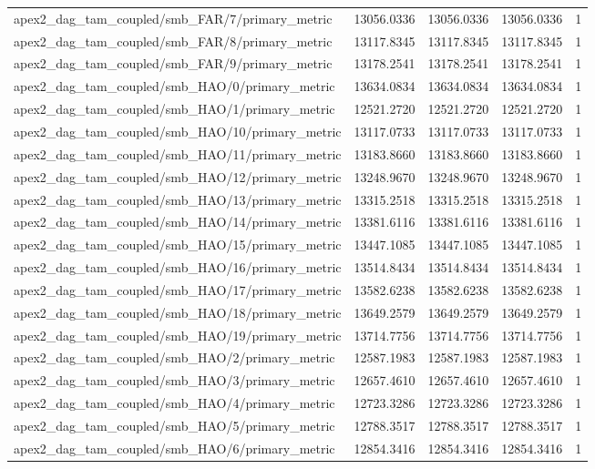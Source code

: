 \begin{table}[h]
\begin{tabular}{lrrrr}
apex2_dag_tam_coupled/smb_FAR/7/primary_metric & 13056.0336 & 13056.0336 & 13056.0336 & 1 \\
apex2_dag_tam_coupled/smb_FAR/8/primary_metric & 13117.8345 & 13117.8345 & 13117.8345 & 1 \\
apex2_dag_tam_coupled/smb_FAR/9/primary_metric & 13178.2541 & 13178.2541 & 13178.2541 & 1 \\
apex2_dag_tam_coupled/smb_HAO/0/primary_metric & 13634.0834 & 13634.0834 & 13634.0834 & 1 \\
apex2_dag_tam_coupled/smb_HAO/1/primary_metric & 12521.2720 & 12521.2720 & 12521.2720 & 1 \\
apex2_dag_tam_coupled/smb_HAO/10/primary_metric & 13117.0733 & 13117.0733 & 13117.0733 & 1 \\
apex2_dag_tam_coupled/smb_HAO/11/primary_metric & 13183.8660 & 13183.8660 & 13183.8660 & 1 \\
apex2_dag_tam_coupled/smb_HAO/12/primary_metric & 13248.9670 & 13248.9670 & 13248.9670 & 1 \\
apex2_dag_tam_coupled/smb_HAO/13/primary_metric & 13315.2518 & 13315.2518 & 13315.2518 & 1 \\
apex2_dag_tam_coupled/smb_HAO/14/primary_metric & 13381.6116 & 13381.6116 & 13381.6116 & 1 \\
apex2_dag_tam_coupled/smb_HAO/15/primary_metric & 13447.1085 & 13447.1085 & 13447.1085 & 1 \\
apex2_dag_tam_coupled/smb_HAO/16/primary_metric & 13514.8434 & 13514.8434 & 13514.8434 & 1 \\
apex2_dag_tam_coupled/smb_HAO/17/primary_metric & 13582.6238 & 13582.6238 & 13582.6238 & 1 \\
apex2_dag_tam_coupled/smb_HAO/18/primary_metric & 13649.2579 & 13649.2579 & 13649.2579 & 1 \\
apex2_dag_tam_coupled/smb_HAO/19/primary_metric & 13714.7756 & 13714.7756 & 13714.7756 & 1 \\
apex2_dag_tam_coupled/smb_HAO/2/primary_metric & 12587.1983 & 12587.1983 & 12587.1983 & 1 \\
apex2_dag_tam_coupled/smb_HAO/3/primary_metric & 12657.4610 & 12657.4610 & 12657.4610 & 1 \\
apex2_dag_tam_coupled/smb_HAO/4/primary_metric & 12723.3286 & 12723.3286 & 12723.3286 & 1 \\
apex2_dag_tam_coupled/smb_HAO/5/primary_metric & 12788.3517 & 12788.3517 & 12788.3517 & 1 \\
apex2_dag_tam_coupled/smb_HAO/6/primary_metric & 12854.3416 & 12854.3416 & 12854.3416 & 1 \\

\end{tabular}
\end{table}
